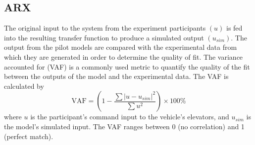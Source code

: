 \subsection{ARX}
The original input to the system from the experiment participants $(u)$ is fed into the resulting transfer function to produce a simulated output $(u_{sim})$.
The output from the pilot models are compared with the experimental data from which they are generated in order to determine the quality of fit.
The variance accounted for (VAF) is a commonly used metric to quantify the quality of the fit between the outputs of the model and the experimental data.
The VAF is calculated by
\begin{equation}
    \mbox{VAF} = \left( 1 - \dfrac{\sum{|u - u_{sim}|^2}} {\sum{u^2}} \right) \times \mbox{100\%}
\end{equation}
where $u$ is the participant's command input to the vehicle's elevators, and $u_{sim}$ is the model's simulated input.
The VAF ranges between 0 (no correlation) and 1 (perfect match).

